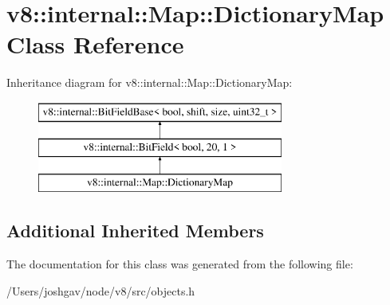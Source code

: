 \hypertarget{classv8_1_1internal_1_1_map_1_1_dictionary_map}{}\section{v8\+:\+:internal\+:\+:Map\+:\+:Dictionary\+Map Class Reference}
\label{classv8_1_1internal_1_1_map_1_1_dictionary_map}
Inheritance diagram for v8\+:\+:internal\+:\+:Map\+:\+:Dictionary\+Map\+:\begin{figure}[H]
\begin{center}
\leavevmode
\includegraphics[height=3.000000cm]{classv8_1_1internal_1_1_map_1_1_dictionary_map}
\end{center}
\end{figure}
\subsection*{Additional Inherited Members}


The documentation for this class was generated from the following file\+:\begin{DoxyCompactItemize}
\item 
/\+Users/joshgav/node/v8/src/objects.\+h\end{DoxyCompactItemize}
